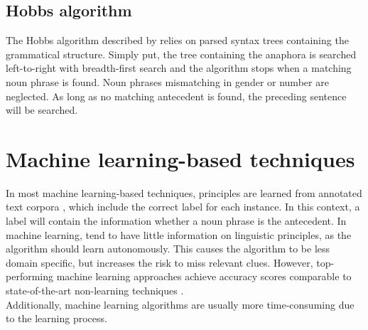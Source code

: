 \subsection{Hobbs algorithm}
The Hobbs algorithm described by \citep{hobbs1978resolving} relies on parsed syntax trees containing the grammatical structure. Simply put, the tree containing the anaphora is searched left-to-right with breadth-first search and the algorithm stops when a matching noun phrase is found. Noun phrases mismatching in gender or number are neglected. As long as no matching antecedent is found, the preceding sentence will be searched.

\section{Machine learning-based techniques}

In most machine learning-based techniques, principles are learned from annotated text corpora  \citep{soon2001machine, bergsma2005automatic}, which include the correct label for each instance. In this context, a label will contain the information whether a noun phrase is the antecedent. In machine learning, tend to have little information on linguistic principles, as the algorithm should learn autonomously. This causes the algorithm to be less domain specific, but increases the risk to miss relevant clues. However, top-performing machine learning approaches achieve accuracy scores comparable to state-of-the-art non-learning techniques \citep{soon2001machine}. \\
Additionally, machine learning algorithms are usually more time-consuming due to the learning process.

